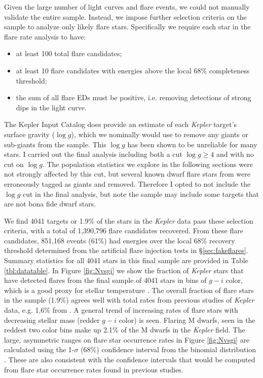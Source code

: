 \documentclass[twocolumn]{aastex6}
\newcommand{\Kepler}{\textsl{Kepler}\xspace}
\begin{document}
Given the large number of light curves and flare events, we could not manually validate the entire sample. Instead, we impose further selection criteria on the sample to analyze only likely flare stars. Specifically we require each star in the flare rate analysis to have:
\begin{itemize}
\item at least 100 total flare candidates;
\item at least 10 flare candidates with energies above the local 68\% completeness threshold;
\item the sum of all flare EDs must be positive, i.e. removing detections of strong dips in the light curve.
\end{itemize}
The Kepler Input Catalog \citep{brown2011a} does provide an estimate of each \Kepler target's surface gravity ($\log g$), which we nominally would use to remove any giants or sub-giants from the sample. This $\log g$ has been shown to be unreliable for many stars. I carried out the final analysis including both a cut $\log g \ge 4$ and with no cut on $\log g$. The population statistics we explore in the following sections were not strongly affected by this cut, but several known dwarf flare stars from \citet{walkowicz2011} were erroneously tagged as giants and removed. Therefore I opted to not include the $\log g$ cut in the final analysis, but note the sample may include some targets that are not bona fide dwarf stars.

We find 4041 targets or 1.9\% of the stars in the \Kepler data pass these selection criteria, with a total of 1,390,796 flare candidates  recovered. From these flare candidates, 851,168 events (61\%) had energies over the local 68\% recovery threshold determined from the artificial flare injection tests in \S\ref{sec:fakeflares}. Summary statistics for all 4041 stars in this final sample are provided in Table \ref{tbl:datatable}.
 In Figure \ref{fig:Nvsgi} we show the fraction of \Kepler stars that have detected flares from the final sample of 4041 stars in bins of $g-i$ color, which is a good proxy for stellar temperature \citep{covey2007,davenport2014}. The overall fraction of flare stars in the sample (1.9\%) agrees well with total rates from previous studies of \Kepler data, e.g. 1.6\% from \citet{walkowicz2011}. A general trend of increasing rates of flare stars with decreasing stellar mass (redder $g-i$ color) is seen. Flaring M dwarfs, seen in the reddest two color bins make up 2.1\% of the M dwarfs in the \Kepler field. The large, asymmetric ranges  on flare star occurrence rates in Figure \ref{fig:Nvsgi} are calculated using the 1-$\sigma$ (68\%) confidence interval from the binomial distribution \citep[e.g. see][]{burgasser2003}. These are also consistent with the confidence intervals that would be computed from flare star occurrence rates found in previous studies. %
\end{document}
